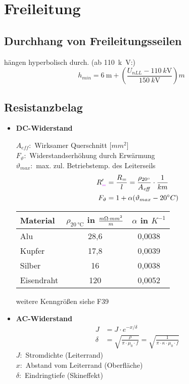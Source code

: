 \section{Freileitung}
\subsection{Durchhang von Freileitungsseilen}
hängen hyperbolisch durch. (ab \SI{110}{k\volt}:)
\begin{equation*}
    h_{min} = \SI{6}{\metre} + \left(\frac{U_{\mathit{nLL}} - \SI{110}{k\volt}}{\SI{150}{k\volt}}\right)m
\end{equation*}
\subsection{Resistanzbelag}
\begin{itemize}
\item[]{\textbf{DC-Widerstand}}

$A_{\mathit{eff}}:$ Wirksamer Querschnitt [$mm^2$]\\
$F_{\vartheta}:$ Widerstandserhöhung durch Erwärmung\\
$\vartheta_{max}:$ max. zul. Betriebstemp. des Leiterseils
\begin{align*}
    R_{\textcolor{purple}{=}}' &= \frac{R_{=}}{l} = \frac{\rho_{20 \degree}}{A_{\mathit{eff}}}\cdot\frac{1}{km}\\
    F_{\vartheta} &= 1 + \alpha (\vartheta_{max} - 20\degree C)
\end{align*}

\begin{table}[h]
\centering
\begin{tabular}[h]{|l|c|c|}
    \hline
    Material & $\rho_{\SI{20}{\degreeCelsius}}$ in $\frac{m\ohm \cdot mm^2}{m}$ & $\alpha$ in $K^{-1}$ \\
    \hline
    Alu & 28,6 & 0,0038 \\
    \hline
    Kupfer & 17,8 & 0,0039 \\
    \hline
    Silber & 16 & 0,0038 \\
    \hline
    Eisendraht & 120 & 0,0052 \\
    \hline
\end{tabular}
\end{table}
weitere Kenngrößen siehe F39\\

\item[]{\textbf{AC-Widerstand}}
\begin{align*}
    J &= J \cdot e^{-x/\delta}\\
    \delta &= \sqrt{ \frac{\rho}{\pi \cdot \mu_{0} \cdot f}}
     = \sqrt{ \frac{1}{\pi \cdot \kappa \cdot \mu_{0} \cdot f}}
\end{align*}
$J:$ Stromdichte (Leiterrand)\\
$x:$ Abstand vom Leiterrand (Oberfläche)\\
$\delta:$ Eindringtiefe (Skineffekt)\\


\end{itemize}
